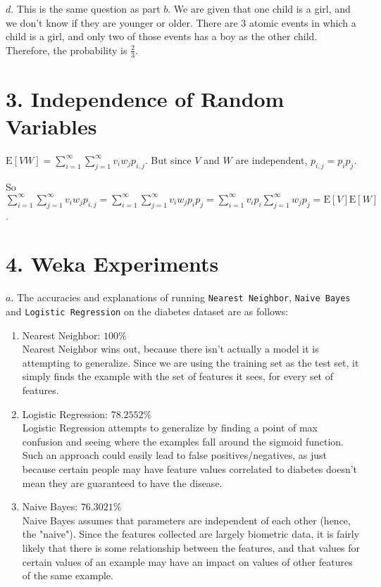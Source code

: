 \documentclass[11pt]{article}
\begin{document}
\noindent $d.$ This is the same question as part $b$. We are given that one child is a girl, and we don't know if they are younger or older. There are 3 atomic events in which a child is a girl, and only two of those events has a boy as the other child. Therefore, the probability is $\frac{2}{3}$.

\section*{3. Independence of Random Variables}

\noindent $\text{E} [VW]= \sum\limits_{i=1}^{\infty}\sum\limits_{j=1}^{\infty} v_{i}w_{j}p_{i,j}$. But since $V$ and $W$ are independent, $p_{i,j}=p_{i}p_{j}$.

\noindent So $\sum\limits_{i=1}^{\infty}\sum\limits_{j=1}^{\infty} v_{i}w_{j}p_{i,j}=\sum\limits_{i=1}^{\infty}\sum\limits_{j=1}^{\infty}v_{i}w_{j}p_{i}p_{j}=\sum\limits_{i=1}^{\infty}v_{i}p_{i}\sum\limits_{j=1}^{\infty}w_{j}p_{j}=\text{E}[V]\text{E}[W]$.

\section*{4. Weka Experiments}
\noindent $a.$ The accuracies and explanations of running \texttt{Nearest Neighbor}, \texttt{Naive Bayes} and \texttt{Logistic Regression} on the diabetes dataset are as follows:
\begin{enumerate}
\item Nearest Neighbor: $100\%$\\
Nearest Neighbor wins out, because there isn't actually a model it is attempting to generalize. Since we are using the training set as the test set, it simply finds the example with the set of features it sees, for every set of features.
\item Logistic Regression: $78.2552\%$\\
Logistic Regression attempts to generalize by finding a point of max confusion and seeing where the examples fall around the sigmoid function. Such an approach could easily lead to false positives/negatives, as just because certain people may have feature values correlated to diabetes doesn't mean they are guaranteed to have the disease.
\item Naive Bayes: $76.3021\%$\\
Naive Bayes assumes that parameters are independent of each other (hence, the "naive"). Since the features collected are largely biometric data, it is fairly likely that there is some relationship between the features, and that values for certain values of an example may have an impact on values of other features of the same example. 
\end{enumerate}
\end{document}
